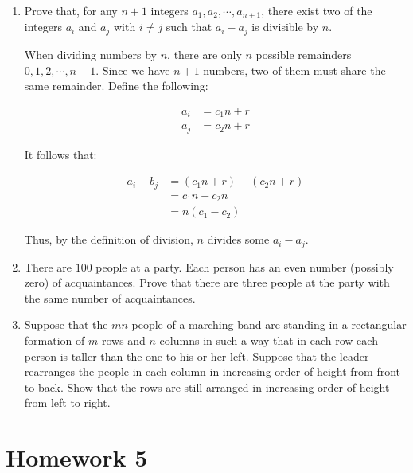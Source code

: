 \documentclass{report}
\begin{document}
{\begin{enumerate}
          Thus, the student must have studied for exactly $13$ hours on some sequence
          of days.

    \item Prove that, for any $n + 1$ integers $a_1, a_2, \cdots ,a_{n+1}$, there exist two of the integers
          $a_i$ and $a_j$ with $i\ne j$ such that $a_i - a_j$ is divisible by $n$.

          When dividing numbers by $n$, there are only $n$ possible remainders
          $0,1,2,\cdots,n-1$. Since we have $n+1$ numbers, two of them must share
          the same remainder. Define the following:

          \begin{align*}
              a_i & = c_1n+r \\
              a_j & = c_2n+r
          \end{align*}

          It follows that:

          \begin{align*}
              a_i - b_j & = (c_1n + r) - (c_2n + r) \\
                        & = c_1n - c_2n             \\
                        & = n(c_1-c_2)
          \end{align*}

          Thus, by the definition of division, $n$ divides some $a_i - a_j$.

    \item There are $100$ people at a party. Each person has an even number (possibly
          zero) of acquaintances. Prove that there are three people at the party with the
          same number of acquaintances.



    \item Suppose that the $mn$ people of a marching band are standing in a rectangular
          formation of $m$ rows and $n$ columns in such a way that in each row each person
          is taller than the one to his or her left. Suppose that the leader rearranges the
          people in each column in increasing order of height from front to back. Show
          that the rows are still arranged in increasing order of height from left to right.

\end{enumerate}

\section{Homework 5}

}
\end{document}
